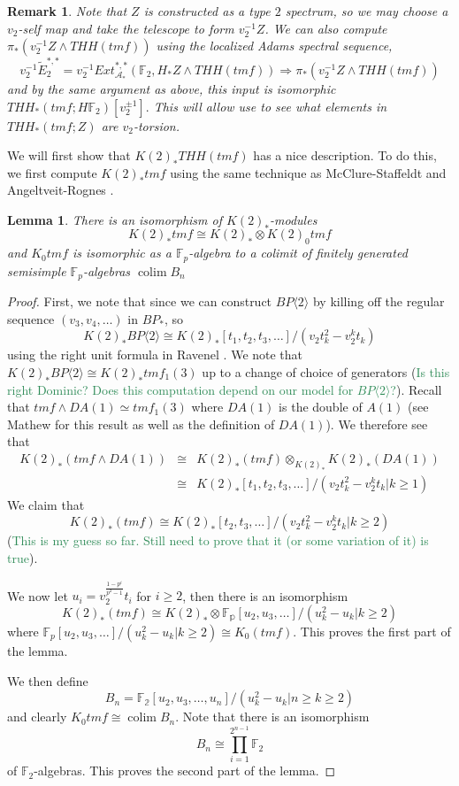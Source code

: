 \documentclass[12pt]{amsart}
\DeclareMathOperator*{\colim}{colim}
\newtheorem{lem}[equation]{Lemma}
\newtheorem{rem}[equation]{Remark}
\theoremstyle{definition}
\numberwithin{equation}{section}
\numberwithin{figure}{section}
\begin{document}
\begin{rem}
Note that $Z$ is constructed as a type $2$ spectrum, so we may choose a $v_2$-self map and take the telescope to form $v_2^{-1}Z$. We can also compute $\pi_*(v_2^{-1}Z\wedge THH(tmf))$ using the localized Adams spectral sequence,
\[ v_2^{-1}\tilde{E}_2^{*,*}=v_2^{-1} Ext_{\mathcal{A}_*}^{*,*}(\mathbb{F}_2,H_*Z\wedge THH(tmf))\Rightarrow \pi_*(v_2^{-1}Z\wedge THH(tmf)) \] 
and by the same argument as above, this input is isomorphic $THH_*(tmf;H\mathbb{F}_2)[v_2^{\pm 1}].$
This will allow use to see what elements in $THH_*(tmf;Z)$ are $v_2$-torsion. 
\end{rem}
We will first show that $K(2)_*THH(tmf)$ has a nice description. To do this, we first compute $K(2)_*tmf$ using the same technique as McClure-Staffeldt \cite{qx} and Angeltveit-Rognes \cite{qx}. 
\begin{lem}\label{K(2) of tmf}
There is an isomorphism of $K(2)_*$-modules 
\[ K(2)_*tmf\cong K(2)_*\otimes K(2)_0 tmf \]
and $K_0tmf$ is isomorphic as a $\mathbb{F}_p$-algebra to a colimit of finitely generated semisimple $\mathbb{F}_p$-algebras $\colim B_n$
\end{lem}
\begin{proof}
First, we note that since we can construct $BP\langle2\rangle$ by killing off the regular sequence $(v_3,v_4,\dots)$ in $BP_*$, so 
\[ K(2)_*BP\langle2\rangle \cong K(2)_*[t_1,t_2,t_3,\dots]/(v_2t_k^2-v_2^kt_k)\]
using the right unit formula in Ravenel \cite{qx}. We note that $K(2)_*BP\langle2\rangle\cong K(2)_*tmf_1(3)$ up to a change of choice of generators (\textcolor{seagreen}{Is this right Dominic? Does this computation depend on our model for $BP\langle2\rangle$?}). Recall that $tmf\wedge DA(1)\simeq tmf_1(3)$ where $DA(1)$ is the double of $A(1)$ (see Mathew \cite{qx} for this result as well as the definition of $DA(1)$). We therefore see that 
\[ 
\begin{array}{rcl} K(2)_*(tmf\wedge DA(1))&\cong& K(2)_*(tmf)\otimes_{K(2)_*}K(2)_*(DA(1))\\
&\cong&  K(2)_*[t_1,t_2,t_3,\dots]/(v_2t_k^2-v_2^kt_k |k\ge 1)
\end{array}
\]
We claim that 
\[ K(2)_*(tmf)\cong K(2)_*[t_2,t_3,\dots]/(v_2t_k^2-v_2^kt_k|k\ge 2)\] 
(\textcolor{seagreen}{This is my guess so far. Still need to prove that it (or some variation of it) is true}). 

We now let $u_i=v_2^{\frac{1-p^i}{p^2-1}}t_i$ for $i\ge 2$, then there is an isomorphism 
\[ K(2)_*(tmf)\cong K(2)_*\otimes \mathbb{F_p}[u_2,u_3,\dots]/(u_k^2-u_k|k\ge 2)\] 
where $\mathbb{F}_p[u_2,u_3,\dots]/(u_k^2-u_k|k\ge 2)\cong K_0(tmf)$. This proves the first part of the lemma. 

We then define 
\[ B_n=\mathbb{F_2}[u_2,u_3,\dots,u_n]/(u_k^2-u_k | n\ge k\ge 2)\] 
and clearly $K_0tmf \cong \colim B_n$. Note that there is an isomorphism
\[ B_n\cong \prod_{i=1}^{2^{n-1}} \mathbb{F}_2\]
of $\mathbb{F}_2$-algebras. This proves the second part of the lemma. 
\end{proof}
\end{document}
